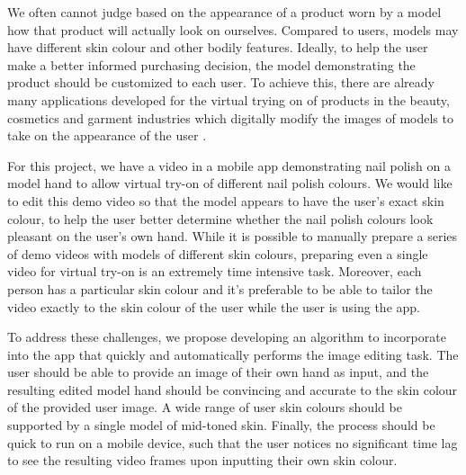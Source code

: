 We often cannot judge based on the appearance of a product worn by a model how that product will actually look on ourselves. Compared to users, models may have different skin colour and other bodily features. Ideally, to help the user make a better informed purchasing decision, the model demonstrating the product should be customized to each user. To achieve this, there are already many applications developed for the virtual trying on of products in the beauty, cosmetics and garment industries which digitally modify the images of models to take on the appearance of the user \cite{zhang_2017_try} \cite{shilkrot_2013_garment, li_2015_replace}.

For this project, we have a video in a mobile app demonstrating nail polish on a model hand to allow virtual try-on of different nail polish colours. We would like to edit this demo video so that the model appears to have the user's exact skin colour, to help the user better determine whether the nail polish colours look pleasant on the user's own hand. While it is possible to manually prepare a series of demo videos with models of different skin colours, preparing even a single video for virtual try-on is an extremely time intensive task. Moreover, each person has a particular skin colour and it's preferable to be able to tailor the video exactly to the skin colour of the user while the user is using the app.

To address these challenges, we propose developing an algorithm to incorporate into the app that quickly and automatically performs the image editing task. The user should be able to provide an image of their own hand as input, and the resulting edited model hand should be convincing and accurate to the skin colour of the provided user image. A wide range of user skin colours should be supported by a single model of mid-toned skin. Finally, the process should be quick to run on a mobile device, such that the user notices no significant time lag to see the resulting video frames upon inputting their own skin colour.

